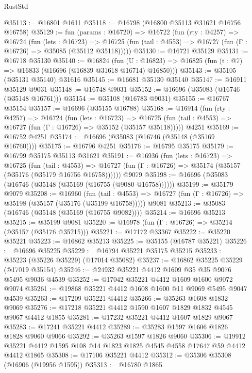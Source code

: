 \begin{lexlean}{RustStd}
\begin{coremodule}
@35113 := @16801 @1611
@35118 := @16798 (@16800 @35113 @31621 @16756 @16758)
@35129 := fun (params : @16720) =>
  @16722
    (fun (rty : @4257) =>
    @16724
      (fun (lets : @16723) =>
      @16725 (fun (tail : @4553) => @16727 (fun (Γ : @16726) => @35085 (@35112 @35118)))))
@35130 := @16721 @35129
@35131 := @16718 @35130
@35140 := @16824
    (fun (U : @16823) => @16825 (fun (t : @7) => @16833 (@16696 (@16839 @31618 @16714) @16850)))
@35143 := @35105 (@35131 @35140) @31616
@35145 := @16681 @35130 @35140
@35147 := @16911 @35129 @9031
@35148 := @16748 @9031
@35152 := @16696 (@35083 (@16746 (@35148 @16761)))
@35154 := @35108 (@16783 @9031)
@35155 := @16767 @35154
@35157 := @16696 (@35155 @16788)
@35168 := @16914
    (fun (rty : @4257) =>
    @16724
      (fun (lets : @16723) =>
      @16725 (fun (tail : @4553) => @16727 (fun (Γ : @16726) => @35152 (@35157 @35118)))))
    @4251
@35169 := @16752 @4251
@35174 := @16696 (@35083 (@16746 (@35148 (@35169 @16760))))
@35175 := @16796 @4251
@35176 := @16795 @35175
@35179 := @16799 @35175 @35113 @31621
@35191 := @16936
    (fun (lets : @16723) =>
    @16725
      (fun (tail : @4553) =>
      @16727 (fun (Γ : @16726) => @35174 (@35157 (@35176 (@35179 @16756 @16758))))))
    @9079
@35198 := @16696 (@35083 (@16746 (@35148 (@35169 (@16755 (@9080 @16758))))))
@35199 := @35179 @9079
@35208 := @16960
    (fun (tail : @4553) => @16727 (fun (Γ : @16726) => @35198 (@35157 (@35176 (@35199 @16758)))))
    @9081
@35213 := @35083 (@16746 (@35148 (@35169 (@16755 @9082))))
@35214 := @16696 @35213
@35215 := @35199 @9081
@35220 := @16978 (fun (Γ : @16726) => @35214 (@35157 (@35176 @35215)))
@35221 := @17172 @33367
@35222 := @35220 @35221
@35223 := @16862 @35213
@35225 := @35155 (@16787 @35221)
@35226 := @16696 @35225
@35229 := @16794 @35221 @35175 @35215
@35233 := @35223 (@35226 @35229) (@17014 @35082)
@35237 := @16862 @35225 @35229 (@17019 @35154)
@35246 := @24932 @35221 @4412 @1609 @35 @35 @9076 @5495 @9036 @4539
@35252 := @17042 @35221 @4412 @1609 @1600 @9072 @9074
@35261 := @19868 @35221 @4412 @1608 @1600 @11 @9069 @5495 @9047 @4539
@35263 := @17209 @35221 @4412
@35266 := @35263 @1608 @1832 @9069
@35276 := @17218 @35221 @4412 @1590 @1607 @1829 @1832 @4545 @9067 @4412 @1855
@35281 := @17232 @35221 @4412 @1607 @1829 @9067
@35283 := @17241 @35221 @4412
@35289 := @35283 @1597 @1606 @1826 @1828 @9060 @9066
@35292 := @35263 @1597 @1826 @9060
@35306 := @19912 @35221 @4412 @1595 @108 @14 @1823 @1825 @4545 @4558 @17647 @59 @4412 @4412 @1865
@35308 := @17106 @35221 @4412
@35312 := @35306 @35308 (@16906 (@19956 @1595))
@35313 := @16780 @1865

\end{coremodule}
\end{lexlean}
